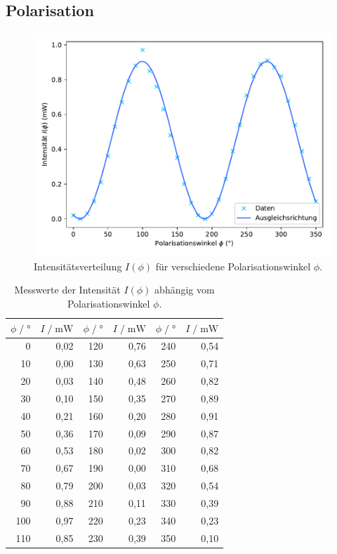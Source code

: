 \subsection{Polarisation}

\begin{figure}[H]
    \centering
    \includegraphics[scale=0.7]{content/pol.pdf}
    \vspace{-10pt}
    \caption{Intensitätsverteilung $I(\phi)$ für verschiedene Polarisationswinkel $\phi$.}
    \label{fig:pol}
\end{figure}

\begin{table}[H]
    \centering
    \caption{Messwerte der Intensität $I(\phi)$ abhängig vom Polarisationswinkel $\phi$.}
    \label{tab:pol}
    \begin{tabular}{r r | r r | r r}
    \toprule
    $\phi \;/\; \si{\degree}$ & $I \;/\; \si{\milli\watt}$ & $\phi \;/\; \si{\degree}$ & $I \;/\; \si{\milli\watt}$
    & $\phi \;/\; \si{\degree}$ & $I \;/\; \si{\milli\watt}$ \\
    \midrule
         0 & 0,02 & 120 & 0,76 & 240 & 0,54 \\
        10 & 0,00 & 130 & 0,63 & 250 & 0,71 \\
        20 & 0,03 & 140 & 0,48 & 260 & 0,82 \\
        30 & 0,10 & 150 & 0,35 & 270 & 0,89 \\
        40 & 0,21 & 160 & 0,20 & 280 & 0,91 \\
        50 & 0,36 & 170 & 0,09 & 290 & 0,87 \\
        60 & 0,53 & 180 & 0,02 & 300 & 0,82 \\
        70 & 0,67 & 190 & 0,00 & 310 & 0,68 \\
        80 & 0,79 & 200 & 0,03 & 320 & 0,54 \\
        90 & 0,88 & 210 & 0,11 & 330 & 0,39 \\
       100 & 0,97 & 220 & 0,23 & 340 & 0,23 \\
       110 & 0,85 & 230 & 0,39 & 350 & 0,10 \\
    \bottomrule
    \end{tabular}
\end{table}

